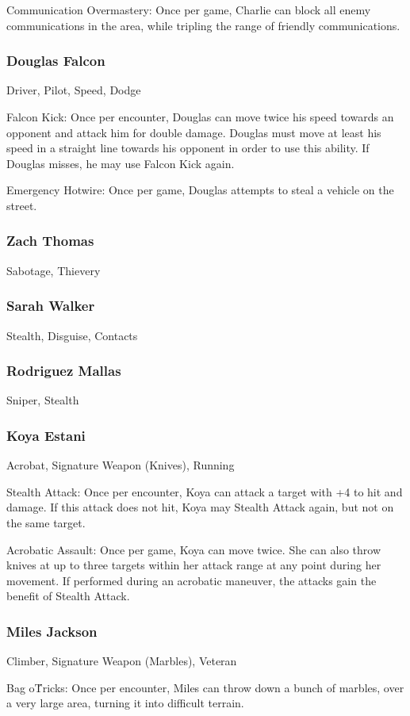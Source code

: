 \documentclass{article}
\begin{document}
\begin{multicols}{2}
Communication Overmastery: Once per game, Charlie can block all enemy communications in the area, while tripling the range of friendly communications.
\subsubsection{Douglas Falcon}
Driver, Pilot, Speed, Dodge

Falcon Kick: Once per encounter, Douglas can move twice his speed towards an opponent and attack him for double damage. Douglas must move at least his speed in a straight line towards his opponent in order to use this ability. If Douglas misses, he may use Falcon Kick again.

Emergency Hotwire: Once per game, Douglas attempts to steal a vehicle on the street.
\subsubsection{Zach Thomas}
Sabotage, Thievery
\subsubsection{Sarah Walker}
Stealth, Disguise, Contacts
\subsubsection{Rodriguez Mallas}
Sniper, Stealth
\subsubsection{Koya Estani}
Acrobat, Signature Weapon (Knives), Running

Stealth Attack: Once per encounter, Koya can attack a target with +4 to hit and damage. If this attack does not hit, Koya may Stealth Attack again, but not on the same target.

Acrobatic Assault: Once per game, Koya can move twice. She can also throw knives at up to three targets within her attack range at any point during her movement. If performed during an acrobatic maneuver, the attacks gain the benefit of Stealth Attack.
\subsubsection{Miles Jackson}
Climber, Signature Weapon (Marbles), Veteran

Bag o\' Tricks: Once per encounter, Miles can throw down a bunch of marbles,
over a very large area, turning it into difficult terrain.


\end{multicols}
\end{document}
